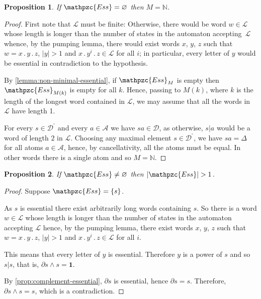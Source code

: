 \documentclass[a4paper,final]{article}
\let\emptyset\varnothing
\theoremstyle{plain}
\newtheorem{proposition}[proposition]{Proposition}
\theoremstyle{remark}
\theoremstyle{definition}
\begin{document}
\begin{proposition}
  If ${\mathpzc{Ess}} = \emptyset$ then $M = {\mathbb{N}}$.
\end{proposition}
\begin{proof}
  First note that ${\mathcal{L}}$ must be finite:  Otherwise, there would be word $w \in {\mathcal{L}}$ whose length is longer than the number of states in the automaton accepting~${\mathcal{L}}$ whence, by the pumping lemma, there would exist words $x$, $y$, $z$ such that $w = x{\mathbin{.}} y{\mathbin{.}} z$, $|y| > 1$ and $x{\mathbin{.}} y^i{\mathbin{.}} z \in {\mathcal{L}}$ for all $i$; in particular, every letter of $y$ would be essential in contradiction to the hypothesis.
  
  By \autoref{lemma:non-minimal-essential}, if ${\mathpzc{Ess}}_M$ is empty then ${\mathpzc{Ess}}_{M(k)}$ is empty for all $k$.  Hence, passing to $M(k)$, where $k$ is the length of the longest word contained in ${\mathcal{L}}$, we may assume that all the words in ${\mathcal{L}}$ have length 1.
  
  For every $s \in {{\mathcal{D}}^{\!{}^{\circ}\!}}$ and every $a \in{\mathcal{A}}$ we have $sa \in {\mathcal{D}}$, as otherwise, $s|a$ would be a word of length $2$ in ${\mathcal{L}}$.
  Choosing any maximal element $s \in {{\mathcal{D}}^{\!{}^{\circ}\!}}$, we have $s a = \Delta$ for all atoms $a \in {\mathcal{A}}$, hence, by cancellativity, all the atoms must be equal.
  In other words there is a single atom and so $M = {\mathbb{N}}$.
\end{proof}

\begin{proposition}
  If ${\mathpzc{Ess}} \ne \emptyset$ then $|{\mathpzc{Ess}}| > 1$.
\end{proposition}
\begin{proof}
  Suppose ${\mathpzc{Ess}} = \{ s \}$.

  As $s$ is essential there exist arbitrarily long words containing
  $s$.  So there is a word $w \in {\mathcal{L}}$ whose length is longer than
  the number of states in the automaton accepting ${\mathcal{L}}$ hence, by
  the pumping lemma, there exist words $x$, $y$, $z$ such that $w =
  x{\mathbin{.}} y{\mathbin{.}} z$, $|y| > 1$ and $x{\mathbin{.}} y^i{\mathbin{.}} z \in {\mathcal{L}}$ for all $i$.  

  This means that every letter of $y$ is essential.  Therefore $y$ is
  a power of $s$ and so $s|s$, that is, ${\partial} s {\wedge} s
  = {\mathbf{1}}$.

  By \autoref{prop:complement-essential}, ${\partial} s$ is
  essential, hence ${\partial} s = s$.  Therefore, ${\partial} s
  {\wedge} s = s$, which is a contradiction.
\end{proof}
\end{document}
